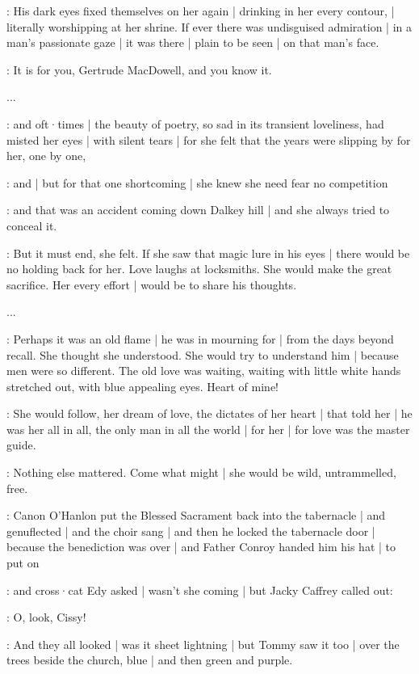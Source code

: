 \gertySex:
His dark eyes fixed themselves on her again |
drinking in her every contour, |
literally worshipping at her shrine.
If ever there was undisguised admiration |
in a man's passionate gaze |
it was there |
plain to be seen |
on that man's face.

\gertyNovel:
It is for you,
Gertrude MacDowell,
and you know it.

...

\gertyRomantic:
and oft·times |
the beauty of poetry,
so sad in its transient loveliness,
had misted her eyes |
with silent tears |
for she felt
that the years were slipping by for her,
one by one,

\gertyNovel:
and |
but for that one shortcoming |%
she knew she need fear no competition

\gertyReal:
and that was an accident coming down Dalkey hill |
and she always tried to conceal it.

\gertyNovel:
But it must end,
she felt.
If she saw that magic lure in his eyes |
there would be no holding back for her.
Love laughs at locksmiths.
She would make the great sacrifice.
Her every effort |
would be to share his thoughts.

...

\gertyNovel:
Perhaps it was an old flame |
he was in mourning for |
from the days beyond recall.
She thought she understood.
She would try to understand him |
because men were so different.
The old love was waiting,
waiting with little white hands stretched out,
with blue appealing eyes.%
Heart of mine!

\gertyRomantic:
She would follow,
her dream of love,
the dictates of her heart |
that told her |
he was her all in all,
the only man in all the world |
for her |
for love was the master guide.

\gertySex:
Nothing else mattered.
Come what might |
she would be wild,
untrammelled,
free.

\Nrelig:
Canon O'Hanlon
put the Blessed Sacrament
back into the tabernacle |
and genuflected |
and the choir sang  |
and then he locked the tabernacle door |
because the benediction was over |
and Father Conroy handed him his hat |
to put on

:
and cross·cat Edy asked |
wasn't she coming |
but Jacky Caffrey called out:

\jacky:
O,
look,
Cissy!

:
And they all looked |
was it sheet lightning |%
but Tommy saw it too |
over the trees beside the church,
blue |
and then green
and purple.

